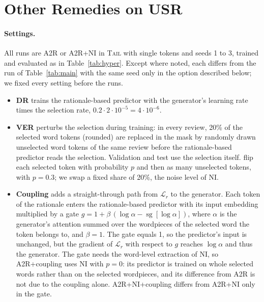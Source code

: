 \documentclass[11pt]{article}
\newcommand{\TAIL}{\textup{\textsc{Tail}}}
\newcommand{\sg}{\operatorname{sg}}
\begin{document}
\section{Other Remedies on USR}
\label{app:remedies}

\paragraph{Settings.} All runs are A2R or A2R+NI in \TAIL{} with single tokens and seeds 1 to 3, trained and evaluated as in Table~\ref{tab:hyper}. Except where noted, each differs from the run of Table~\ref{tab:main} with the same seed only in the option described below; we fixed every setting before the runs.
\begin{itemize}
  \setlength\itemsep{1pt}
  \item \textbf{DR} \citep{liu2023dr} trains the rationale-based predictor with the generator's learning rate times the selection rate, $0.2 \cdot 2 \cdot 10^{-5} = 4 \cdot 10^{-6}$.
  \item \textbf{VER} \citep{liu-etal-2025-exploring} perturbs the selection during training: in every review, 20\% of the selected word tokens (rounded) are replaced in the mask by randomly drawn unselected word tokens of the same review before the rationale-based predictor reads the selection. Validation and test use the selection itself. \citet{liu-etal-2025-exploring} flip each selected token with probability $p$ and then as many unselected tokens, with $p = 0.3$; we swap a fixed share of 20\%, the noise level of NI.
  \item \textbf{Coupling} adds a straight-through path from $\mathcal{L}_r$ to the generator. Each token of the rationale enters the rationale-based predictor with its input embedding multiplied by a gate $g = 1 + \beta\,(\log \alpha - \sg[\log \alpha])$, where $\alpha$ is the generator's attention summed over the wordpieces of the selected word the token belongs to, and $\beta = 1$. The gate equals 1, so the predictor's input is unchanged, but the gradient of $\mathcal{L}_r$ with respect to $g$ reaches $\log \alpha$ and thus the generator. The gate needs the word-level extraction of NI, so A2R+coupling uses NI with $p = 0$: its predictor is trained on whole selected words rather than on the selected wordpieces, and its difference from A2R is not due to the coupling alone. A2R+NI+coupling differs from A2R+NI only in the gate.
\end{itemize}
\end{document}
